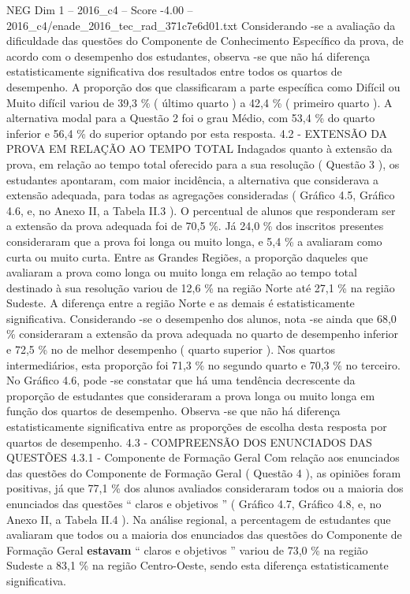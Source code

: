\begin{textsample}{NEG Dim 1 – 2016\_c4 – Score -4.00 – 2016\_c4/enade\_2016\_tec\_rad\_371c7e6d01.txt}
Considerando -se a avaliação da dificuldade das questões do Componente de Conhecimento Específico da prova, de acordo com o desempenho dos estudantes, observa -se que não há diferença estatisticamente significativa dos resultados entre todos os quartos de desempenho.
A proporção dos que classificaram a parte específica como Difícil ou Muito difícil variou de 39,3 \% ( último quarto ) a 42,4 \% ( primeiro quarto ).
A alternativa modal para a Questão 2 foi o grau Médio, com 53,4 \% do quarto inferior e 56,4 \% do superior optando por esta resposta. 4.2 - EXTENSÃO DA PROVA EM RELAÇÃO AO TEMPO TOTAL Indagados quanto à extensão da prova, em relação ao tempo total oferecido para a sua resolução ( Questão 3 ), os estudantes apontaram, com maior incidência, a alternativa que considerava a extensão adequada, para todas as agregações consideradas ( Gráfico 4.5, Gráfico 4.6, e, no Anexo II, a Tabela II.3 ).
O percentual de alunos que responderam ser a extensão da prova adequada foi de 70,5 \%.
Já 24,0 \% dos inscritos presentes consideraram que a prova foi longa ou muito longa, e 5,4 \% a avaliaram como curta ou muito curta.
Entre as Grandes Regiões, a proporção daqueles que avaliaram a prova como longa ou muito longa em relação ao tempo total destinado à sua resolução variou de 12,6 \% na região Norte até 27,1 \% na região Sudeste.
A diferença entre a região Norte e as demais é estatisticamente significativa.
Considerando -se o desempenho dos alunos, nota -se ainda que 68,0 \% consideraram a extensão da prova adequada no quarto de desempenho inferior e 72,5 \% no de melhor desempenho ( quarto superior ).
Nos quartos intermediários, esta proporção foi 71,3 \% no segundo quarto e 70,3 \% no terceiro.
No Gráfico 4.6, pode -se constatar que há uma tendência decrescente da proporção de estudantes que consideraram a prova longa ou muito longa em função dos quartos de desempenho.
Observa -se que não há diferença estatisticamente significativa entre as proporções de escolha desta resposta por quartos de desempenho. 4.3 - COMPREENSÃO DOS ENUNCIADOS DAS QUESTÕES 4.3.1 - Componente de Formação Geral Com relação aos enunciados das questões do Componente de Formação Geral ( Questão 4 ), as opiniões foram positivas, já que 77,1 \% dos alunos avaliados consideraram todos ou a maioria dos enunciados das questões “ claros e objetivos ” ( Gráfico 4.7, Gráfico 4.8, e, no Anexo II, a Tabela II.4 ).
Na análise regional, a percentagem de estudantes que avaliaram que todos ou a maioria dos enunciados das questões do Componente de Formação Geral \textbf{estavam} “ claros e objetivos ” variou de 73,0 \% na região Sudeste a 83,1 \% na região Centro-Oeste, sendo esta diferença estatisticamente significativa.

\end{textsample}
